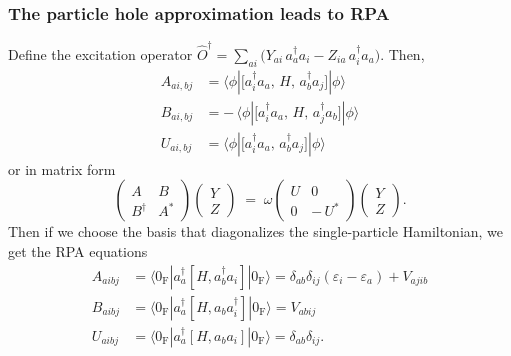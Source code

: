 \documentclass{beamer}
\begin{document}
\begin{frame}
    \frametitle{The particle hole approximation leads to RPA}
Define the excitation operator $
\hat O^\dagger
=\sum_{a i}\bigl(Y_{a i}\,a_a^\dagger a_i - Z_{i a}\,a_i^\dagger a_a\bigr).$ Then, 
\begin{align}
A_{ai,bj}
&=\langle\phi|\bigl[a_i^\dagger a_a,\,H,\,a_b^\dagger a_j\bigr]|\phi\rangle\\
B_{ai,bj}
&=-\,\langle\phi|\bigl[a_i^\dagger a_a,\,H,\,a_j^\dagger a_b\bigr]|\phi\rangle \\
U_{ai,bj}
&=\langle\phi|\bigl[a_i^\dagger a_a,\,a_b^\dagger a_j\bigr]|\phi\rangle
\end{align}
or in matrix form
\begin{equation}
\begin{pmatrix}
A & B \\[6pt]
B^\dagger & A^*
\end{pmatrix}
\begin{pmatrix}
Y \\ Z
\end{pmatrix}
\;=\;
\omega
\begin{pmatrix}
U & 0 \\[3pt]
0 & -\,U^*
\end{pmatrix}
\begin{pmatrix}
Y \\ Z
\end{pmatrix}.
\label{eq:block_matrix}
\end{equation}
Then if we choose the basis that diagonalizes the single-particle Hamiltonian, we get the RPA equations
\begin{align}
    A_{a i b j} &= \langle 0_{\mathrm{F}} | a_a^\dagger \left[H, a_b^\dagger a_i\right] | 0_{\mathrm{F}} \rangle = \delta_{a b} \delta_{i j}\left(\varepsilon_i-\varepsilon_a\right) + V_{a j i b} \\
    B_{a i b j} &= \langle 0_{\mathrm{F}} | a_a^\dagger \left[H, a_b a_i^\dagger\right] | 0_{\mathrm{F}} \rangle = V_{a b i j} \\
    U_{a i b j} &= \langle 0_{\mathrm{F}} | a_a^\dagger \left[H, a_b a_i\right] | 0_{\mathrm{F}} \rangle = \delta_{a b} \delta_{i j} .
\end{align}

\end{frame}
\end{document}
